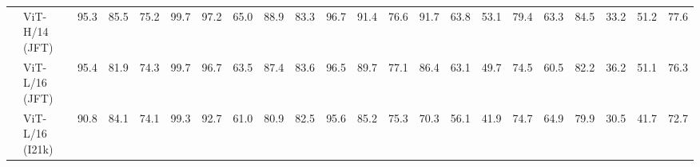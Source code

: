 \documentclass{article} \usepackage{iclr2021_conference,times}
\newcommand{\oursabbrv}{ViT\xspace}
\begin{document}
\begin{table}[ht]
\begin{tabularx}{\linewidth}{p{10pt}p{1.6cm}!{\color{lightgray}\vline} CCCCCCC!{\color{lightgray}\vline}CCCC!{\color{lightgray}\vline}CCCCCCCC!{\color{lightgray}\vline}C}
& \oursabbrv{}-H/14 (JFT) & 95.3 & 85.5 & 75.2 & 99.7 & 97.2 & 65.0 & 88.9 & 83.3 & 96.7 & 91.4 & 76.6 & 91.7 & 63.8 & 53.1 & 79.4 & 63.3 & 84.5 & 33.2 & 51.2 & 77.6  \\

& \oursabbrv{}-L/16 (JFT) & 95.4 & 81.9 & 74.3 & 99.7 & 96.7 & 63.5 & 87.4 & 83.6 & 96.5 & 89.7 & 77.1 & 86.4 & 63.1 & 49.7 & 74.5 & 60.5 & 82.2 & 36.2 & 51.1 & 76.3  \\

& \oursabbrv{}-L/16 (I21k) & 90.8 & 84.1 & 74.1 & 99.3 & 92.7 & 61.0 & 80.9 & 82.5 & 95.6 & 85.2 & 75.3 & 70.3 & 56.1 & 41.9 & 74.7 & 64.9 & 79.9 & 30.5 & 41.7 & 72.7  \\

\bottomrule
\end{tabularx}
 \label{tab:vtab_tasks}
\end{table} 
\end{document}
